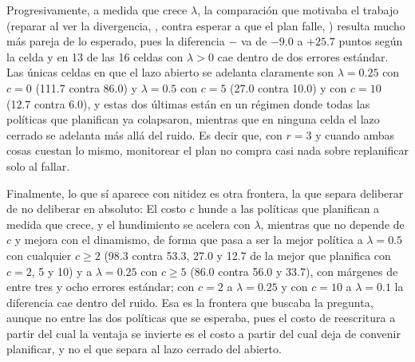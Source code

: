 Progresivamente, a medida que crece $\lambda$, la comparación que motivaba el trabajo (reparar al ver la divergencia, \CL, contra esperar a que el plan falle, \OL) resulta mucho más pareja de lo esperado, pues la diferencia \OL$-$\CL{} va de $-9.0$ a $+25.7$ puntos según la celda y en 13 de las 16 celdas con $\lambda>0$ cae dentro de dos errores estándar. Las únicas celdas en que el lazo abierto se adelanta claramente son $\lambda=0.25$ con $c=0$ (111.7 contra 86.0) y $\lambda=0.5$ con $c=5$ (27.0 contra 10.0) y con $c=10$ (12.7 contra 6.0), y estas dos últimas están en un régimen donde todas las políticas que planifican ya colapsaron, mientras que en ninguna celda el lazo cerrado se adelanta más allá del ruido. Es decir que, con $r=3$ y cuando ambas cosas cuestan lo mismo, monitorear el plan no compra casi nada sobre replanificar solo al fallar.

Finalmente, lo que sí aparece con nitidez es otra frontera, la que separa deliberar de no deliberar en absoluto: El costo $c$ hunde a las políticas que planifican a medida que crece, y el hundimiento se acelera con $\lambda$, mientras que \MB{} no depende de $c$ y mejora con el dinamismo, de forma que pasa a ser la mejor política a $\lambda=0.5$ con cualquier $c\ge2$ (98.3 contra 53.3, 27.0 y 12.7 de la mejor que planifica con $c=2$, 5 y 10) y a $\lambda=0.25$ con $c\ge5$ (86.0 contra 56.0 y 33.7), con márgenes de entre tres y ocho errores estándar; con $c=2$ a $\lambda=0.25$ y con $c=10$ a $\lambda=0.1$ la diferencia cae dentro del ruido. Esa es la frontera que buscaba la pregunta, aunque no entre las dos políticas que se esperaba, pues el costo de reescritura a partir del cual la ventaja se invierte es el costo a partir del cual deja de convenir planificar, y no el que separa al lazo cerrado del abierto.

